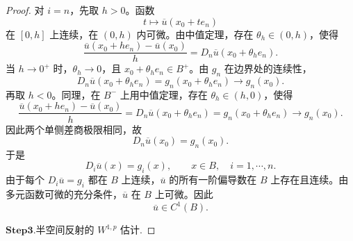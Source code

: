 \documentclass[../../main.tex]{subfiles}
\begin{document}
\begin{proof}
对 \(i=n\)，先取 \(h>0\)。函数
\[
t\mapsto\overline u(x_0+te_n)
\]
在 \([0,h]\) 上连续，在 \((0,h)\) 内可微。由中值定理，存在 \(\theta_h\in(0,h)\)，使得
\[
\frac{\overline u(x_0+he_n)-\overline u(x_0)}{h}
=D_n\overline u(x_0+\theta_h e_n).
\]
当 \(h\to0^{+}\) 时，\(\theta_h\to0\)，且 \(x_0+\theta_h e_n\in B^{+}\)。由 \(g_n\) 在边界处的连续性，
\[
D_n\overline u(x_0+\theta_h e_n)
=g_n(x_0+\theta_h e_n)
\to g_n(x_0).
\]
再取 \(h<0\)。同理，在 \(B^{-}\) 上用中值定理，存在 \(\theta_h\in(h,0)\)，使得
\[
\frac{\overline u(x_0+he_n)-\overline u(x_0)}{h}
=D_n\overline u(x_0+\theta_h e_n)
=g_n(x_0+\theta_h e_n)
\to g_n(x_0).
\]
因此两个单侧差商极限相同，故
\[
D_n\overline u(x_0)=g_n(x_0).
\]
于是
\[
D_i\overline u(x)=g_i(x),\qquad x\in B,\quad i=1,\cdots,n.
\]
由于每个 \(D_i\overline u=g_i\) 都在 \(B\) 上连续，\(\overline u\) 的所有一阶偏导数在 \(B\) 上存在且连续。由多元函数可微的充分条件，\(\overline u\) 在 \(B\) 上可微。因此
\[
\overline u\in C^{1}(B).
\]

\noindent$\mathbf{Step}\bm{3}$.{\heiti 半空间反射的 \(W^{1,p}\) 估计.}


\end{proof}
\end{document}
